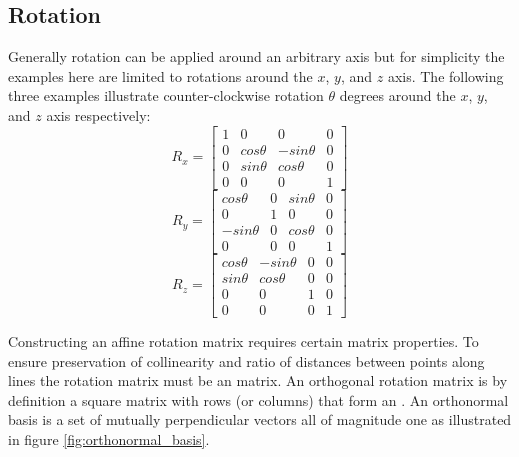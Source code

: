 \subsection*{Rotation}
\label{sec:basic_math_rotation}
Generally rotation can be applied around an arbitrary axis but for
simplicity the examples here are limited to rotations around the $x$, $y$, and $z$ axis.
The following three examples illustrate counter-clockwise rotation $\theta$ degrees
around the $x$, $y$, and $z$ axis respectively:
\begin{equation}
\label{eq:rotation_matrix_x}
R_x = 
\begin{bmatrix} 
1 & 0 & 0 & 0 \\ 
0 & cos \theta & - sin \theta & 0 \\ 
0 & sin \theta & cos \theta & 0\\
0 & 0 & 0 & 1 
\end{bmatrix} 
\end{equation} 
\begin{equation}
\label{eq:rotation_matrix_y}
R_y = 
\begin{bmatrix} 
cos \theta & 0 & sin \theta & 0 \\ 
0 &  1 & 0 & 0 \\ 
- sin \theta & 0 & cos \theta & 0\\
0 & 0 & 0 & 1 
\end{bmatrix} 
\end{equation} 
\begin{equation}
\label{eq:rotation_matrix_z}
R_z = 
\begin{bmatrix} 
cos \theta & - sin \theta & 0 & 0 \\ 
sin \theta & cos \theta & 0 & 0 \\ 
0 & 0 & 1 & 0\\
0 & 0 & 0 & 1 
\end{bmatrix} 
\end{equation} 

Constructing an affine rotation matrix requires certain matrix
properties. To ensure preservation of collinearity and ratio of
distances between points along lines the rotation matrix must be an
 matrix. An
orthogonal rotation matrix is by definition a square matrix with rows
(or columns) that
form an  . An orthonormal
basis is a set of mutually perpendicular vectors all of magnitude
one  as illustrated in figure
\vref{fig:orthonormal_basis}.  

